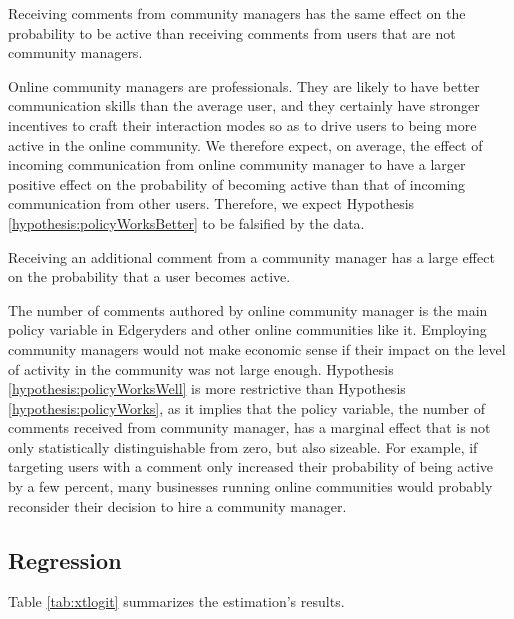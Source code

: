 \begin{policyWorks}
	Receiving comments from community managers has the same effect on the probability to be active than receiving comments from users that are not community managers. 
	\label{hypothesis:policyWorksBetter}
\end{policyWorks}

Online community managers are professionals. They are likely to have better communication skills than the average user, and they certainly have stronger incentives to craft their interaction modes so as to drive users to being more active in the online community. We therefore expect, on average, the effect of incoming communication from online community manager to have a larger positive effect on the probability of becoming active than that of incoming communication from other users. Therefore, we expect Hypothesis \ref{hypothesis:policyWorksBetter} to be falsified by the data. 

\begin{policyWorks}
	Receiving an additional comment from a community manager has a large effect on the probability that a user becomes active. 	
	\label{hypothesis:policyWorksWell}
\end{policyWorks}

The number of comments authored by online community manager is the main policy variable in Edgeryders and other online communities like it. Employing community managers would not make economic sense if their impact on the level of activity in the community was not large enough. Hypothesis \ref{hypothesis:policyWorksWell} is more restrictive than Hypothesis \ref{hypothesis:policyWorks}, as it implies that the policy variable, the number of comments received from community manager, has a marginal effect that is not only statistically distinguishable from zero, but also sizeable. For example, if targeting users with a comment only increased their probability of being active by a few percent, many businesses running online communities would probably reconsider their decision to hire a community manager. 

\subsection{Regression}

Table \ref{tab:xtlogit} summarizes the estimation's results. 


